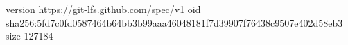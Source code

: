 version https://git-lfs.github.com/spec/v1
oid sha256:5fd7c0fd0587464b64bb3b99aaa46048181f7d39907f76438c9507e402d58eb3
size 127184
